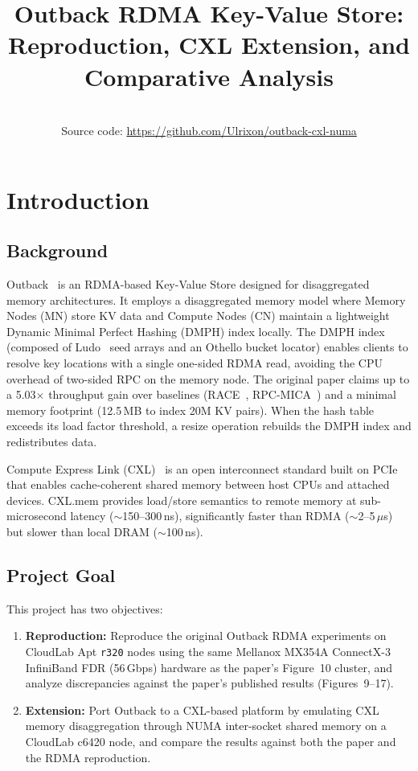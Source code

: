 \documentclass[conference]{IEEEtran}
\title{Outback RDMA Key-Value Store:\\
Reproduction, CXL Extension, and Comparative Analysis}
\author{\IEEEauthorblockN{Cheng-Shun Chuang}\\
\small Source code: \url{https://github.com/Ulrixon/outback-cxl-numa}}
\begin{document}
\maketitle

\section{Introduction}

\subsection{Background}

Outback~\cite{outback} is an RDMA-based Key-Value Store designed for disaggregated memory architectures. It employs a disaggregated memory model where Memory Nodes (MN) store KV data and Compute Nodes (CN) maintain a lightweight Dynamic Minimal Perfect Hashing (DMPH) index locally. The DMPH index (composed of Ludo~\cite{ludo} seed arrays and an Othello bucket locator) enables clients to resolve key locations with a single one-sided RDMA read, avoiding the CPU overhead of two-sided RPC on the memory node. The original paper claims up to a 5.03$\times$ throughput gain over baselines (RACE~\cite{race}, RPC-MICA~\cite{mica}) and a minimal memory footprint (12.5\,MB to index 20M KV pairs). When the hash table exceeds its load factor threshold, a resize operation rebuilds the DMPH index and redistributes data.

Compute Express Link (CXL)~\cite{cxl} is an open interconnect standard built on PCIe that enables cache-coherent shared memory between host CPUs and attached devices. CXL.mem provides load/store semantics to remote memory at sub-microsecond latency ($\sim$150--300\,ns), significantly faster than RDMA ($\sim$2--5\,$\mu$s) but slower than local DRAM ($\sim$100\,ns).

\subsection{Project Goal}

This project has two objectives:
\begin{enumerate}[nosep]
  \item \textbf{Reproduction:} Reproduce the original Outback RDMA experiments on CloudLab Apt \texttt{r320} nodes using the same Mellanox MX354A ConnectX-3 InfiniBand FDR (56\,Gbps) hardware as the paper's Figure~10 cluster, and analyze discrepancies against the paper's published results (Figures~9--17).
  \item \textbf{Extension:} Port Outback to a CXL-based platform by emulating CXL memory disaggregation through NUMA inter-socket shared memory on a CloudLab c6420 node, and compare the results against both the paper and the RDMA reproduction.
\end{enumerate}
\end{document}
